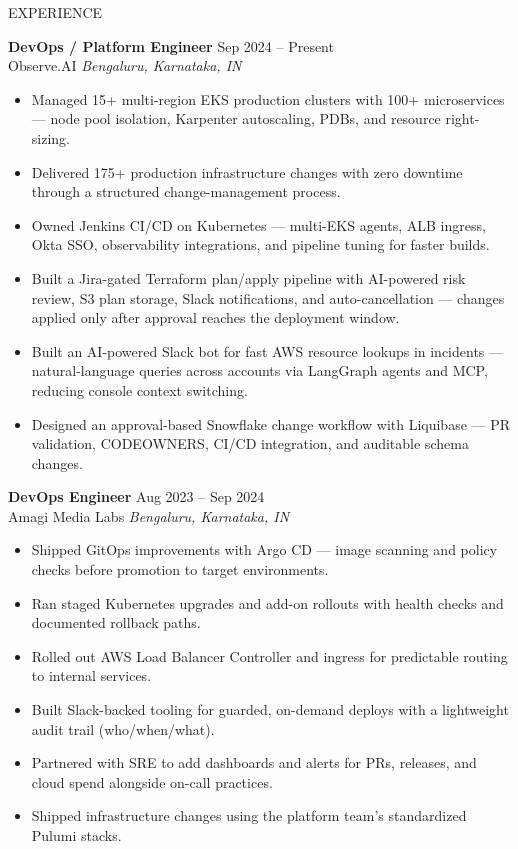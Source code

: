 \documentclass{resume} %
\begin{document}
\begin{rSection}{EXPERIENCE}

\textbf{DevOps / Platform Engineer} \hfill Sep 2024 -- Present\\
Observe.AI \hfill \textit{Bengaluru, Karnataka, IN}

\begin{itemize}
    \itemsep -3pt {} 
    \item Managed 15+ multi-region EKS production clusters with 100+ microservices --- node pool isolation, Karpenter autoscaling, PDBs, and resource right-sizing.
    \item Delivered 175+ production infrastructure changes with zero downtime through a structured change-management process.
    \item Owned Jenkins CI/CD on Kubernetes --- multi-EKS agents, ALB ingress, Okta SSO, observability integrations, and pipeline tuning for faster builds.
    \item Built a Jira-gated Terraform plan/apply pipeline with AI-powered risk review, S3 plan storage, Slack notifications, and auto-cancellation --- changes applied only after approval reaches the deployment window.
    \item Built an AI-powered Slack bot for fast AWS resource lookups in incidents --- natural-language queries across accounts via LangGraph agents and MCP, reducing console context switching.
    \item Designed an approval-based Snowflake change workflow with Liquibase --- PR validation, CODEOWNERS, CI/CD integration, and auditable schema changes.
\end{itemize}


 
\textbf{DevOps Engineer} \hfill Aug 2023 -- Sep 2024\\
Amagi Media Labs \hfill \textit{Bengaluru, Karnataka, IN}

\begin{itemize}
    \itemsep -3pt {} 
    \item Shipped GitOps improvements with Argo CD --- image scanning and policy checks before promotion to target environments.
    \item Ran staged Kubernetes upgrades and add-on rollouts with health checks and documented rollback paths.
    \item Rolled out AWS Load Balancer Controller and ingress for predictable routing to internal services.
    \item Built Slack-backed tooling for guarded, on-demand deploys with a lightweight audit trail (who/when/what).
    \item Partnered with SRE to add dashboards and alerts for PRs, releases, and cloud spend alongside on-call practices.
    \item Shipped infrastructure changes using the platform team's standardized Pulumi stacks.
\end{itemize}


\end{rSection}
\end{document}
